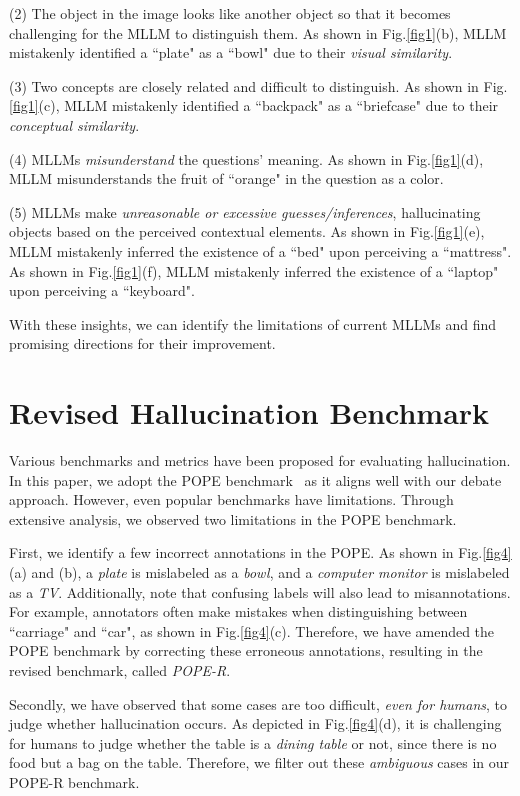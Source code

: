 \documentclass[10pt,twocolumn,letterpaper]{article}
\begin{document}
(2) The object in the image looks like another object so that it becomes challenging for the MLLM to distinguish them. As shown in Fig.\ref{fig1}(b), MLLM mistakenly identified a ``plate" as a ``bowl" due to their \emph{visual similarity}.

(3) Two concepts are closely related and difficult to distinguish. As shown in Fig.\ref{fig1}(c), MLLM mistakenly identified a ``backpack" as a ``briefcase" due to their \emph{conceptual similarity}. 


(4) MLLMs \emph{misunderstand} the questions' meaning. As shown in Fig.\ref{fig1}(d), MLLM misunderstands the fruit of ``orange" in the question as a color.

(5) MLLMs make \emph{unreasonable or excessive guesses/inferences}, hallucinating objects based on the perceived contextual elements. As shown in Fig.\ref{fig1}(e), MLLM mistakenly inferred the existence of a ``bed" upon perceiving a ``mattress". As shown in Fig.\ref{fig1}(f), MLLM mistakenly inferred the existence of a ``laptop" upon perceiving a ``keyboard".

With these insights, we can identify the limitations of current MLLMs and find promising directions for their improvement.


\section{Revised Hallucination Benchmark}
Various benchmarks and metrics have been proposed for evaluating hallucination. In this paper, we adopt the POPE benchmark~\cite{li2023evaluating} as it aligns well with our debate approach. However, even popular benchmarks have limitations. Through extensive analysis, we observed two limitations in the POPE benchmark. 

First, we identify a few incorrect annotations in the POPE. As shown in Fig.\ref{fig4}(a) and (b), a \emph{plate} is mislabeled as a \emph{bowl}, and a \emph{computer monitor} is mislabeled as a \emph{TV}. Additionally, note that confusing labels will also lead to misannotations. For example, annotators often make mistakes when distinguishing between ``carriage" and ``car", as shown in Fig.\ref{fig4}(c). Therefore, we have amended the POPE benchmark by correcting these erroneous annotations, resulting in the revised benchmark, called \emph{POPE-R}. 

Secondly, we have observed that some cases are too difficult, \emph{even for humans}, to judge whether hallucination occurs. As depicted in Fig.\ref{fig4}(d), it is challenging for humans to judge whether the table is a \emph{dining table} or not, since there is no food but a bag on the table. Therefore, we filter out these \emph{ambiguous} cases in our POPE-R benchmark.
\end{document}
